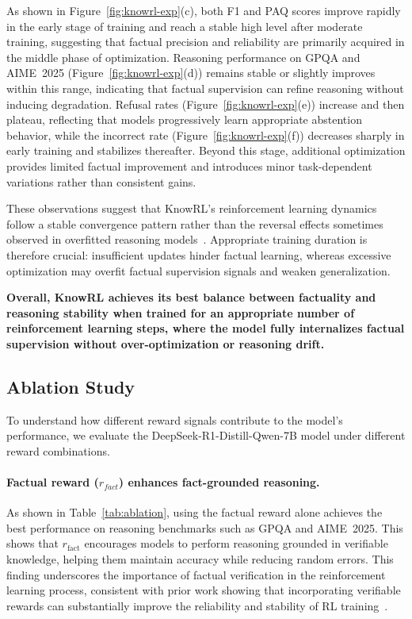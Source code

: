 As shown in Figure~\ref{fig:knowrl-exp}(c), both F1 and PAQ scores improve rapidly in the early stage of training and reach a stable high level after moderate training, suggesting that factual precision and reliability are primarily acquired in the middle phase of optimization. 
Reasoning performance on GPQA and AIME~2025 (Figure~\ref{fig:knowrl-exp}(d)) remains stable or slightly improves within this range, indicating that factual supervision can refine reasoning without inducing degradation. 
Refusal rates (Figure~\ref{fig:knowrl-exp}(e)) increase and then plateau, reflecting that models progressively learn appropriate abstention behavior, while the incorrect rate (Figure~\ref{fig:knowrl-exp}(f)) decreases sharply in early training and stabilizes thereafter. 
Beyond this stage, additional optimization provides limited factual improvement and introduces minor task-dependent variations rather than consistent gains.

These observations suggest that KnowRL’s reinforcement learning dynamics follow a stable convergence pattern rather than the reversal effects sometimes observed in overfitted reasoning models~\citep{berglund2023reversal}. 
Appropriate training duration is therefore crucial: insufficient updates hinder factual learning, whereas excessive optimization may overfit factual supervision signals and weaken generalization.

\textbf{Overall, KnowRL achieves its best balance between factuality and reasoning stability when trained for an appropriate number of reinforcement learning steps, where the model fully internalizes factual supervision without over-optimization or reasoning drift.}


\subsection{Ablation Study}


To understand how different reward signals contribute to the model's performance, we evaluate the DeepSeek-R1-Distill-Qwen-7B model under different reward combinations.

\paragraph{Factual reward ($r_{fact}$) enhances fact-grounded reasoning.}
As shown in Table~\ref{tab:ablation}, using the factual reward alone achieves the best performance on reasoning benchmarks such as GPQA and AIME~2025. 
This shows that $r_{\text{fact}}$ encourages models to perform reasoning grounded in verifiable knowledge, helping them maintain accuracy while reducing random errors. 
This finding underscores the importance of factual verification in the reinforcement learning process, consistent with prior work showing that incorporating verifiable rewards can substantially improve the reliability and stability of RL training~\citep[RLVR;][]{yue2025does}.


